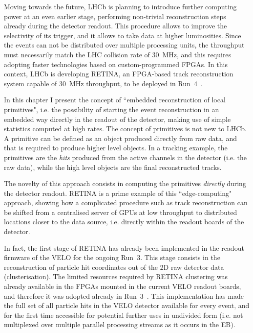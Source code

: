 Moving towards the future, LHCb is planning to introduce further computing power at an even earlier stage, performing non-trivial reconstruction steps already during the detector readout. This procedure allows to improve the selectivity of its trigger, and it allows to take data at higher luminosities. 
Since the events can not be distributed over multiple processing units, the throughput must necessarily match the LHC collision rate of \SI{30}{\mega\hertz}, and this requires adopting faster technologies based on custom-programmed FPGAs.
In this context, LHCb is developing RETINA, an FPGA-based track reconstruction system capable of \SI{30}{\mega\hertz} throughput, to be deployed in Run~4~\cite{Morello:2888549}. 

In this chapter I present the concept of ``embedded reconstruction of local primitives", i.e. the possibility of starting the event reconstruction in an embedded way directly in the readout of the detector, making use of simple statistics computed at high rates. The concept of primitives is not new to LHCb. A primitive can be defined as an object produced directly from raw data, and that is required to produce higher level objects. In a tracking example, the primitives are the \textit{hits} produced from the active channels in the detector (i.e. the raw data), while the high level objects are the final reconstructed tracks. 

The novelty of this approach consists in computing the primitives \textit{directly} during the detector readout. RETINA is a prime example of this ``edge-computing"  approach, showing how a complicated procedure such as track reconstruction can be shifted from a centralised server of GPUs at low throughput to distributed locations closer to the data source, i.e. directly within the readout boards of the detector.

In fact, the first stage of RETINA has already been implemented in the readout firmware of the VELO for the ongoing Run~3. This stage consists in the reconstruction of particle hit coordinates out of the 2D raw detector data (clusterisation). 
The limited resources required by RETINA clustering was already available in the FPGAs mounted in the current VELO readout boards, and therefore it was adopted already in Run~3~\cite{Bassi_2023}.
This implementation has made the full set of all particle hits in the VELO detector available for every event, and for the first time accessible for potential further uses in undivided form (i.e. not multiplexed over multiple parallel processing streams as it occurs in the EB).


